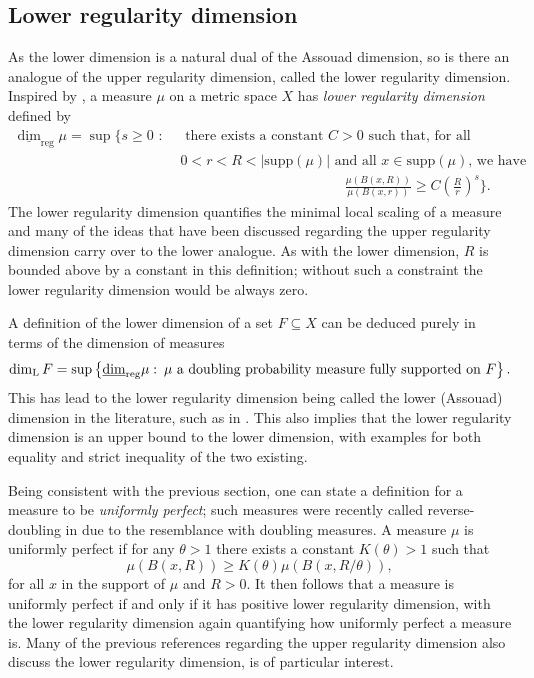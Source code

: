 \subsection{Lower regularity dimension}
\label{sec:intro-lower-reg}


As the lower dimension is a natural dual of the Assouad dimension, so is there an analogue of the upper regularity dimension, called the lower regularity dimension. Inspired by \cite{bylund}, a measure $\mu$ on a metric space $X$ has \textit{lower regularity dimension} defined by 
\begin{align*} 
\underline{\dim}_{\text{reg}} \mu = \sup \Bigg\{ s \geq 0 \, \,  : \,  &\,\text{ there exists a  constant }C  > 0\text{  such that, for all }  \\ & \, 0< r< R < \lvert \text{supp}(\mu)    \rvert \text{  and all $x \in \text{supp} (\mu)$, we have }  \\  & \hspace{5cm} \frac{\mu(B(x,R))}{\mu(B(x,r))} \geq C\left(\frac{R}{r}\right)^{s} \Bigg\}.
\end{align*}
The lower regularity dimension quantifies the minimal local scaling of a measure and many of the ideas that have been discussed regarding the upper regularity dimension carry over to the lower analogue. As with the lower dimension, $R$ is bounded above by a constant in this definition; without such a constraint the lower regularity dimension would be always zero.

A definition of the lower dimension of a set $F\subseteq X$ can be deduced purely in terms of the dimension of measures
\begin{equation}
    \dim_{\text{L}} F = \sup \left\{ \underline{\dim}_{\textup{reg}} \mu \,  \colon \, \mu \text{ a doubling probability measure fully supported on } F\right\}.
\end{equation}
This has lead to the lower regularity dimension being called the lower (Assouad) dimension in the literature, such as in \cite{hare-troscheit}. This also implies that the lower regularity dimension is an upper bound to the lower dimension, with examples for both equality and strict inequality of the two existing.

Being consistent with the previous section, one can state a definition for a measure to be \textit{uniformly perfect}; such measures were recently called reverse-doubling in \cite{anti2} due to the resemblance with doubling measures. A measure $\mu$ is uniformly perfect if for any $\theta > 1$ there exists a constant $K(\theta) > 1$ such that 
\[
\mu(B(x,R)) \ge K(\theta) \mu(B(x,R/\theta)),
\]
for all $x$ in the support of $\mu$ and $R > 0$. It then follows that a measure is uniformly perfect if and only if it has positive lower regularity dimension, with the lower regularity dimension again quantifying how uniformly perfect a measure is. Many of the previous references regarding the upper regularity dimension also discuss the lower regularity dimension, \cite{hare-troscheit} is  of particular interest.
